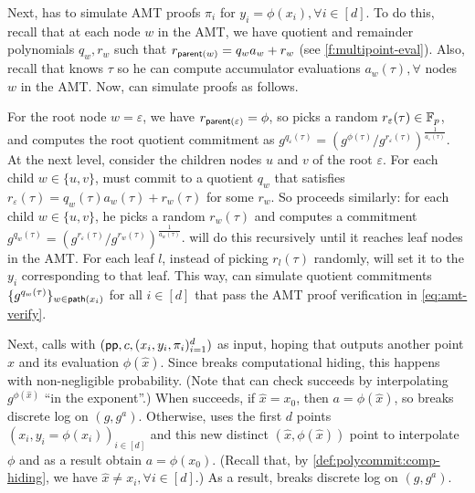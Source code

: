 Next, \AdvB has to simulate AMT proofs $\pi_i$ for $y_i = \phi(x_i), \forall i\in[d]$.
To do this, recall that at each node $w$ in the AMT, we have quotient and remainder polynomials $q_w,r_w$ such that $r_{\mathsf{parent}(w)} = q_w a_w + r_w$ (see \cref{f:multipoint-eval}).
Also, recall that \AdvB knows $\tau$ so he can compute accumulator evaluations $a_w(\tau), \forall$ nodes $w$ in the AMT.
Now, \AdvB can simulate proofs as follows.

For the root node $w = \varepsilon$, we have $r_{\mathsf{parent}(\varepsilon)} = \phi$, so \AdvB picks a random $r_\varepsilon(\tau)\in \mathbb{F}_p$, and computes the root quotient commitment as $g^{q_\varepsilon(\tau)}=(g^{\phi(\tau)}/g^{r_\varepsilon(\tau)})^{\frac{1}{a_\varepsilon(\tau)}}$.
At the next level, consider the children nodes $u$ and $v$ of the root $\varepsilon$.
For each child $w\in\{u,v\}$, \AdvB must commit to a quotient $q_w$ that satisfies $r_\varepsilon(\tau)=q_w(\tau) a_w(\tau) + r_w(\tau)$ for some $r_w$.
So \AdvB proceeds similarly: for each child $w\in\{u,v\}$, he picks a random $r_w(\tau)$ and computes a commitment $g^{q_w(\tau)}=(g^{r_\varepsilon(\tau)}/g^{r_w(\tau)})^{\frac{1}{a_w(\tau)}}$.
\AdvB will do this recursively until it reaches leaf nodes in the AMT.
For each leaf $l$, instead of picking $r_l(\tau)$ randomly, \AdvB will set it to the $y_i$ corresponding to that leaf.
This way, \AdvB can simulate quotient commitments $\{g^{q_w(\tau)}\}_{w\in \mathsf{path}(x_i)}$ for all $i\in[d]$ that pass the AMT proof verification in \cref{eq:amt-verify}.

Next, \AdvB calls \Adv with $(\mathsf{pp}, c, (x_i, y_i, \pi_i)_{i=1}^d)$ as input, hoping that \Adv outputs another point $\hat{x}$ and its evaluation $\phi(\hat{x})$.
Since \Adv breaks computational hiding, this happens with non-negligible probability.
(Note that \AdvB can check \Adv succeeds by interpolating $g^{\phi(\hat{x})}$ ``in the exponent''.)
When \Adv succeeds, if $\hat{x}=x_0$, then $a = \phi(\hat{x})$, so \AdvB breaks discrete log on $(g,g^a)$.
Otherwise, \AdvB uses the first $d$ points $(x_i, y_i=\phi(x_i))_{i\in [d]}$ and this new distinct $(\hat{x},\phi(\hat{x}))$ point to interpolate $\phi$ and as a result obtain $a = \phi(x_0)$.
(Recall that, by \cref{def:polycommit:comp-hiding}, we have $\hat{x}\ne x_i,\forall i\in[d]$.)
As a result, \AdvB breaks discrete log on $(g,g^a)$.

